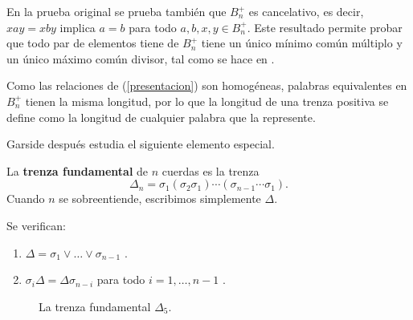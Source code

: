 \documentclass[bibtex, anon]{TEMat-article}
\begin{document}
En la prueba original se prueba también que $B_n^+$ es cancelativo, es decir, $xay=xby$ implica $a=b$ para todo $a,b,x,y\in B_n^+$. Este resultado permite probar que todo par de elementos tiene de $B_n^+$ tiene un único mínimo común múltiplo y un único máximo común divisor, tal como se hace en \cite{Dehornoy}. 

Como las relaciones de (\ref{presentacion}) son homogéneas, palabras equivalentes en $B_n^+$ tienen la misma longitud, por lo que la longitud de una trenza positiva se define como la longitud de cualquier palabra que la represente.  


Garside después estudia el siguiente elemento especial.
\begin{definicion}
	La \textbf{trenza fundamental} de $n$ cuerdas es la trenza
	$$\Delta_n=\sigma_1(\sigma_2\sigma_1)\cdots(\sigma_{n-1}\cdots\sigma_1).$$
	Cuando $n$ se sobreentiende, escribimos simplemente $\Delta$. 
\end{definicion} 


\begin{proposicion}\label{conjuga}
	Se verifican: 
	\begin{enumerate}
		\item $\Delta=\sigma_1\lor\dots\lor\sigma_{n-1}$ \cite[Lema 1]{Garside}.
		\item $\sigma_i\Delta=\Delta\sigma_{n-i}$ para todo $i=1,\dots, n-1$ \cite[Lema 4]{Garside}.
	\end{enumerate}
\end{proposicion} 


\begin{figure}[h!]
	\centering
	\caption{La trenza fundamental $\Delta_5$.}
\end{figure}
\end{document}
